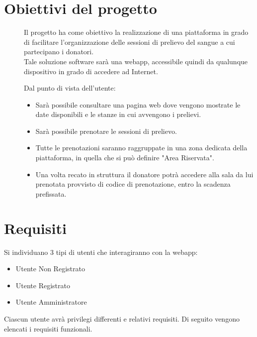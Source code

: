 \documentclass{article}
\newcommand*\circled[1]{\tikz[baseline=(char.base)]{
            \node[shape=circle,draw,inner sep=2pt] (char) {#1};}}
\begin{document}
\section{Obiettivi del progetto}
\begin{description}
    \item[] Il progetto ha come obiettivo la realizzazione di una piattaforma in grado di facilitare l'organizzazione delle sessioni di prelievo del sangue a cui partecipano i donatori. \\
    Tale soluzione software sarà una webapp, accessibile quindi da qualunque dispositivo in grado di accedere ad Internet.
    
    \item[] Dal punto di vista dell'utente:
        \begin{itemize}
            \item Sarà possibile consultare una pagina web dove vengono mostrate le date disponibili e le stanze in cui avvengono i prelievi.
            \item Sarà possibile prenotare le sessioni di prelievo.
            \item Tutte le prenotazioni saranno raggruppate in una zona dedicata della piattaforma, in quella che si può definire "Area Riservata".
            \item Una volta recato in struttura il donatore potrà  accedere alla sala da lui prenotata provvisto di codice di prenotazione, entro la scadenza prefissata.
        \end{itemize}
\end{description}
\clearpage


\section{Requisiti}
\begin{description}
	\item[] Si individuano 3 tipi di utenti che interagiranno con la webapp:
		\begin{itemize}
		\item \circled{Un} Utente Non Registrato
		\item \circled{Re} Utente Registrato
		\item \circled{Ad} Utente Amministratore
		\end{itemize}
	\item Ciascun utente avrà privilegi differenti e relativi requisiti. Di seguito vengono elencati i requisiti funzionali.
\end{description}
\end{document}
